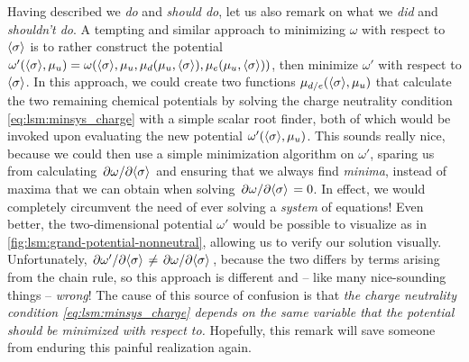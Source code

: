 Having described we \emph{do} and \emph{should do}, let us also remark on what we \emph{did} and \emph{shouldn't do}.
A tempting and similar approach to minimizing $\omega$ with respect to $\langle \sigma \rangle$ is to rather construct the potential $\omega'(\langle \sigma \rangle, \mu_u) = \omega(\langle \sigma \rangle, \mu_u, \mu_d(\mu_u,\langle \sigma \rangle), \mu_e(\mu_u,\langle \sigma \rangle))$, then minimize $\omega'$ with respect to $\langle \sigma \rangle$.
In this approach, we could create two functions $\mu_{d/e}(\langle \sigma \rangle,\mu_u)$ that calculate the two remaining chemical potentials by solving the charge neutrality condition \eqref{eq:lsm:minsys_charge} with a simple scalar root finder, both of which would be invoked upon evaluating the new potential $\omega'(\langle \sigma \rangle,\mu_u)$.
This sounds really nice, because we could then use a simple minimization algorithm on $\omega'$, sparing us from calculating $\pdv{\omega}/{\langle \sigma \rangle}$ and ensuring that we always find \emph{minima}, instead of maxima that we can obtain when solving $\pdv{\omega}/{\langle \sigma \rangle}=0$.
In effect, we would completely circumvent the need of ever solving a \emph{system} of equations!
Even better, the two-dimensional potential $\omega'$ would be possible to visualize as in \cref{fig:lsm:grand-potential-nonneutral}, allowing us to verify our solution visually.
Unfortunately, $\pdv{\omega'}/{\langle \sigma \rangle} \neq \pdv{\omega}/{\langle \sigma \rangle}$, because the two differs by terms arising from the chain rule, so this approach is different and -- like many nice-sounding things -- \emph{wrong}!
The cause of this source of confusion is that \emph{the charge neutrality condition \eqref{eq:lsm:minsys_charge} depends on the same variable that the potential should be minimized with respect to.}
Hopefully, this remark will save someone from enduring this painful realization again.

